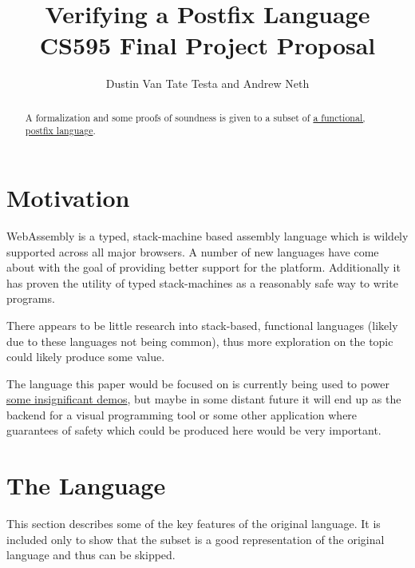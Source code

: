 \documentclass{article}
\title{Verifying a Postfix Language \\
    \large CS595 Final Project Proposal}
\author{Dustin Van Tate Testa and Andrew Neth}
\begin{document}
\maketitle
\begin{abstract}
A formalization and some proofs of soundness is given to a subset of \href{https://github.com/dvtate/postfix-haskell}{a functional, postfix language}.
\end{abstract}

\section{Motivation}
WebAssembly is a typed, stack-machine based assembly language which is wildely supported across all major browsers. A number of new languages have come about with the goal of providing better support for the platform. Additionally it has proven the utility of typed stack-machines as a reasonably safe way to write programs.

There appears to be little research into stack-based, functional languages (likely due to these languages not being common), thus more exploration on the topic could likely produce some value.

The language this paper would be focused on is currently being used to power \href{https://ridder.xyz/game}{some insignificant demos}, but maybe in some distant future it will end up as the backend for a visual programming tool or some other application where guarantees of safety which could be produced here would be very important.

\section{The Language}
This section describes some of the key features of the original language. It is included only to show that the subset is a good representation of the original language and thus can be skipped.
\end{document}
